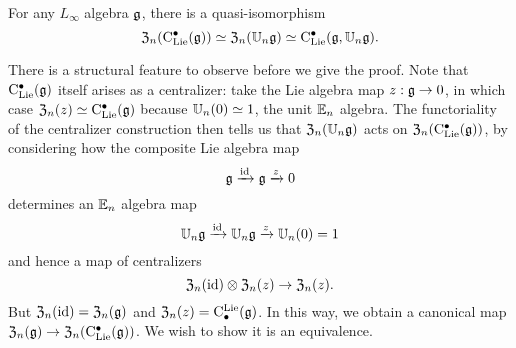 \documentclass[11pt]{amsart}
\numberwithin{equation}{section}
\begin{document}
\begin{prp}
\label{cor: koszul dual to main theorem}
For any $L_\infty$ algebra $\mathfrak g$,
there is a quasi-isomorphism
\[
{\frak Z}_n({\rm C}_{\rm Lie}^\bullet(\mathfrak g)) \simeq {\frak Z}_n(\mathbb U_n \mathfrak g) \simeq {\rm C}_{\rm Lie}^\bullet(\mathfrak g, \mathbb U_n \mathfrak g).
\]
\end{prp}

There is a structural feature to observe before we give the proof.
Note that ${\rm C}_{\rm Lie}^\bullet(\mathfrak g)$ itself arises as a centralizer:
take the Lie algebra map $z: \mathfrak g \to 0$, 
in which case ${\frak Z}_n(z) \simeq {\rm C}_{\rm Lie}^\bullet(\mathfrak g)$ because $\mathbb U_n(0) \simeq 1$, the unit $\mathbb E_n$ algebra.
The functoriality of the centralizer construction then tells us that ${\frak Z}_n(\mathbb U_n \mathfrak g)$ acts on ${\frak Z}_n({\rm C}_{\rm Lie}^\bullet(\mathfrak g))$, by considering how the composite Lie algebra map 
\[
\mathfrak g \xrightarrow{{\rm id}} \mathfrak g \xrightarrow{z} 0
\]
determines an $\mathbb E_n$ algebra map 
\[
\mathbb U_n \mathfrak g \xrightarrow{{\rm id}} \mathbb U_n \mathfrak g \xrightarrow{z} \mathbb U_n(0) = 1
\]
and hence a map of centralizers
\[
{\frak Z}_n({\rm id}) \otimes {\frak Z}_n(z) \to {\frak Z}_n(z).
\]
But ${\frak Z}_n({\rm id}) = {\frak Z}_n(\mathfrak g)$ and ${\frak Z}_n(z) = {\rm C}^{\rm Lie}_\bullet(\mathfrak g)$.
In this way, we obtain a canonical map ${\frak Z}_n(\mathfrak g) \to {{\frak Z}_n({\rm C}_{\rm Lie}^\bullet(\mathfrak g))}$.
We wish to show it is an equivalence. 
\end{document}
